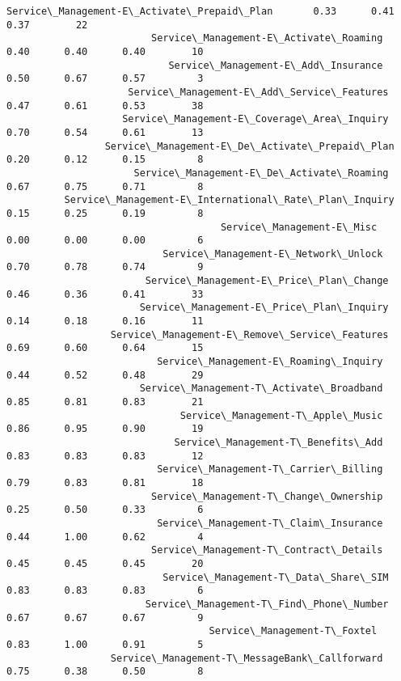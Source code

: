 \documentclass[11pt]{article}
\begin{document}
\begin{Verbatim}[commandchars=\\\{\}]
                    Service\_Management-E\_Activate\_Prepaid\_Plan       0.33      0.41      0.37        22
                         Service\_Management-E\_Activate\_Roaming       0.40      0.40      0.40        10
                            Service\_Management-E\_Add\_Insurance       0.50      0.67      0.57         3
                     Service\_Management-E\_Add\_Service\_Features       0.47      0.61      0.53        38
                    Service\_Management-E\_Coverage\_Area\_Inquiry       0.70      0.54      0.61        13
                 Service\_Management-E\_De\_Activate\_Prepaid\_Plan       0.20      0.12      0.15         8
                      Service\_Management-E\_De\_Activate\_Roaming       0.67      0.75      0.71         8
          Service\_Management-E\_International\_Rate\_Plan\_Inquiry       0.15      0.25      0.19         8
                                     Service\_Management-E\_Misc       0.00      0.00      0.00         6
                           Service\_Management-E\_Network\_Unlock       0.70      0.78      0.74         9
                        Service\_Management-E\_Price\_Plan\_Change       0.46      0.36      0.41        33
                       Service\_Management-E\_Price\_Plan\_Inquiry       0.14      0.18      0.16        11
                  Service\_Management-E\_Remove\_Service\_Features       0.69      0.60      0.64        15
                          Service\_Management-E\_Roaming\_Inquiry       0.44      0.52      0.48        29
                       Service\_Management-T\_Activate\_Broadband       0.85      0.81      0.83        21
                              Service\_Management-T\_Apple\_Music       0.86      0.95      0.90        19
                             Service\_Management-T\_Benefits\_Add       0.83      0.83      0.83        12
                          Service\_Management-T\_Carrier\_Billing       0.79      0.83      0.81        18
                         Service\_Management-T\_Change\_Ownership       0.25      0.50      0.33         6
                          Service\_Management-T\_Claim\_Insurance       0.44      1.00      0.62         4
                         Service\_Management-T\_Contract\_Details       0.45      0.45      0.45        20
                           Service\_Management-T\_Data\_Share\_SIM       0.83      0.83      0.83         6
                        Service\_Management-T\_Find\_Phone\_Number       0.67      0.67      0.67         9
                                   Service\_Management-T\_Foxtel       0.83      1.00      0.91         5
                  Service\_Management-T\_MessageBank\_Callforward       0.75      0.38      0.50         8

\end{Verbatim}
\end{document}
